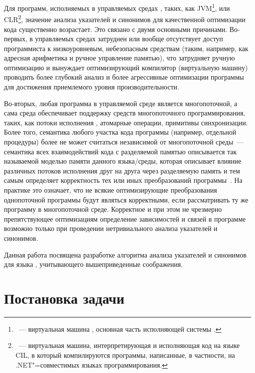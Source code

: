 \documentclass[14pt,titlepage,draft]{extarticle}
\newcommand{\java}{\eng{Java}\xspace}
\begin{document}
    Для программ, исполняемых в управляемых средах , таких, как JVM\footnote{~---
    виртуальная машина \java, основная часть исполняющей системы \java.}, или
    CLR\footnote{~--- виртуальная машина,
    интерпретирующая и исполняющая код на языке CIL, в который компилируются
    программы, написанные, в частности, на .NET"=совместимых языках
    программирования.}, значение анализа указателей и синонимов для
    качественной оптимизации кода существенно возрастает. Это связано с двумя
    основными причинами. Во-первых, в управляемых средах затруднен или вообще
    отсутствует доступ программиста к низкоуровневым, небезопасным средствам
    (таким, например, как адресная арифметика и ручное управление памятью), что
    затрудняет ручную оптимизацию и вынуждает оптимизирующий компилятор
    (виртуальную машину) проводить более глубокий анализ и более агрессивные
    оптимизации программы для достижения приемлемого уровня производительности.

    Во-вторых, любая программа в управляемой среде является многопоточной, а
    сама среда обеспечивает поддержку средств многопоточного программирования,
    таких, как потоки исполнения , атомарные операции,
    примитивы синхронизации. Более того, семантика любого участка кода
    программы (например, отдельной процедуры) более не может считаться
    независимой от многопоточной среды~--- семантика всех взаимодействий кода с
    разделяемой памятью описывается так называемой моделью памяти данного
    языка/среды, которая описывает влияние различных потоков исполнения друг на
    друга через разделяемую память и тем самым определяет корректность тех или
    иных преобразований программы~\cite{manson_jmm}. На практике это означает,
    что не всякие оптимизирующие преобразования однопоточной программы будут
    являться корректными, если рассматривать ту же программу в многопоточной
    среде. Корректное и при этом не чрезмерно препятствующее оптимизациям
    определение зависимостей и связей в программе возможно только при
    проведении нетривиального анализа указателей и синонимов.

    Данная работа посвящена разработке алгоритма анализа указателей и синонимов
    для языка \java, учитывающего вышеприведенные соображения.

  \section{Постановка задачи}
\end{document}
